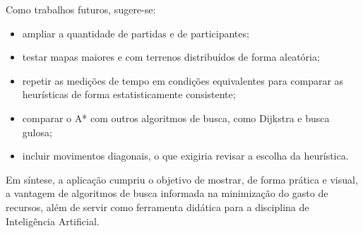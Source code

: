 Como trabalhos futuros, sugere-se:
\begin{itemize}
    \item ampliar a quantidade de partidas e de participantes;
    \item testar mapas maiores e com terrenos distribuídos de forma aleatória;
    \item repetir as medições de tempo em condições equivalentes para comparar as heurísticas de forma estatisticamente consistente;
    \item comparar o A* com outros algoritmos de busca, como Dijkstra e busca gulosa;
    \item incluir movimentos diagonais, o que exigiria revisar a escolha da heurística.
\end{itemize}

Em síntese, a aplicação cumpriu o objetivo de mostrar, de forma prática e visual, a vantagem de algoritmos de busca informada na minimização do gasto de recursos, além de servir como ferramenta didática para a disciplina de Inteligência Artificial.